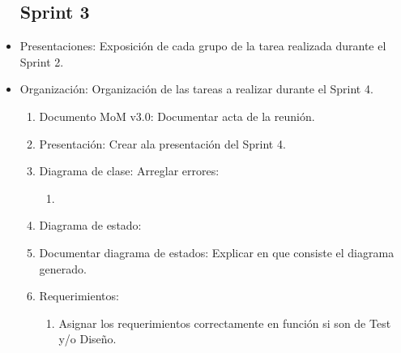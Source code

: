 \begin{itemize}
\subsection{Sprint 3}
\item Presentaciones: Exposición de cada grupo de la tarea realizada durante el Sprint 2.
\item Organización: Organización de las tareas a realizar durante el Sprint 4.
\begin{enumerate}
	\item Documento MoM v3.0: Documentar acta de la reunión.
	\item Presentación: Crear ala presentación del Sprint 4.
	\item Diagrama de clase:	 Arreglar errores:
	\begin{enumerate}
		\item 
	\end{enumerate}
	\item Diagrama de estado:
	\item Documentar diagrama de estados: Explicar en que consiste el diagrama generado.
	\item Requerimientos:
	\begin{enumerate}
		\item Asignar los requerimientos correctamente en función si son de Test y/o Diseño.
	\end{enumerate}
\end{enumerate}



\end{itemize}

